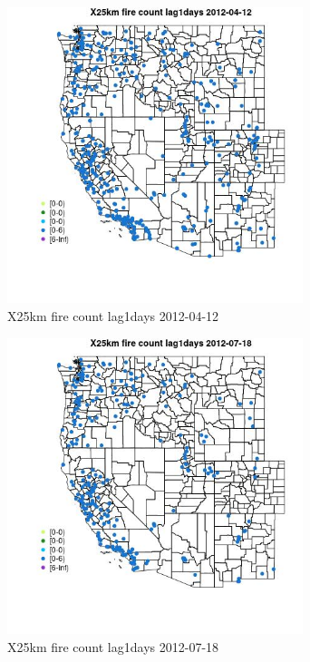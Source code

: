\begin{figure} 
\centering  
\includegraphics[width=0.77\textwidth]{Code_Outputs/Report_ML_input_PM25_Step4_part_e_de_duplicated_aves_compiled_2019-05-14wNAs_MapObsX25km_fire_count_lag1days2012-04-12.jpg} 
\caption{\label{fig:Report_ML_input_PM25_Step4_part_e_de_duplicated_aves_compiled_2019-05-14wNAsMapObsX25km_fire_count_lag1days2012-04-12}X25km fire count lag1days 2012-04-12} 
\end{figure} 
 

\begin{figure} 
\centering  
\includegraphics[width=0.77\textwidth]{Code_Outputs/Report_ML_input_PM25_Step4_part_e_de_duplicated_aves_compiled_2019-05-14wNAs_MapObsX25km_fire_count_lag1days2012-07-18.jpg} 
\caption{\label{fig:Report_ML_input_PM25_Step4_part_e_de_duplicated_aves_compiled_2019-05-14wNAsMapObsX25km_fire_count_lag1days2012-07-18}X25km fire count lag1days 2012-07-18} 
\end{figure} 
 

